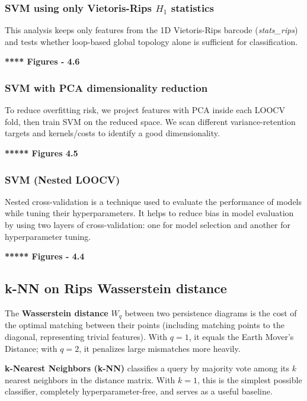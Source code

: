 \documentclass{birkjour}
\theoremstyle{definition}
\theoremstyle{remark}
\numberwithin{equation}{section}
\begin{document}
\subsubsection{SVM using only Vietoris-Rips \(H_1\) statistics}
\quad

This analysis keeps only features from the 1D Vietoris-Rips barcode (\emph{stats\_rips}) and tests whether loop-based global topology alone is sufficient for classification.

\textbf{**** Figures - 4.6}



\subsubsection{SVM with PCA dimensionality reduction}\quad

To reduce overfitting risk, we project features with PCA inside each LOOCV fold, then train SVM on the reduced space. 
We scan different variance-retention targets and kernels/costs to identify a good dimensionality.

\textbf{***** Figures 4.5}


\subsubsection{SVM (Nested LOOCV)}\quad

Nested cross-validation is a technique used to evaluate the performance of models while tuning their hyperparameters. It helps to reduce bias in model evaluation by using two layers of cross-validation: one for model selection and another for hyperparameter tuning.


\textbf{***** Figures - 4.4}

\subsection{k-NN on Rips Wasserstein distance }\quad

The \textbf{Wasserstein distance} \(W_q\) between two persistence diagrams is the cost of the optimal matching between their points (including matching points to the diagonal, representing trivial features). 
With \(q=1\), it equals the Earth Mover’s Distance; with \( q=2 \), it penalizes large mismatches more heavily.

\textbf{k-Nearest Neighbors (k-NN) }classifies a query by majority vote among its \(k\) nearest neighbors in the distance matrix. 
With \(k=1\), this is the simplest possible classifier, completely hyperparameter-free, and serves as a useful baseline.
\end{document}

